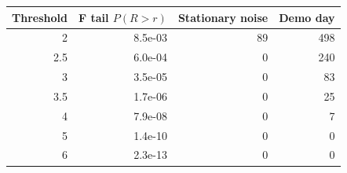 \begin{tabular}{@{}rrrr@{}}
\toprule
Threshold & F tail $P(R>r)$ & Stationary noise & Demo day \\ \midrule
2 & 8.5e-03 & 89 & 498 \\
2.5 & 6.0e-04 & 0 & 240 \\
3 & 3.5e-05 & 0 & 83 \\
3.5 & 1.7e-06 & 0 & 25 \\
4 & 7.9e-08 & 0 & 7 \\
5 & 1.4e-10 & 0 & 0 \\
6 & 2.3e-13 & 0 & 0 \\
\bottomrule
\end{tabular}
